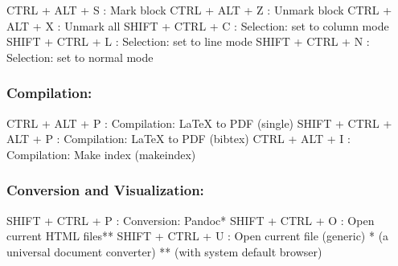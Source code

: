 \vspace{-0.5cm}
\begin{Rtables}[caption={[Selection keyboard shortcuts]
    Selection keyboard shortcuts},
  label=hotkey:selection]
  CTRL  + ALT  + S : Mark block
  CTRL  + ALT  + Z : Unmark block
  CTRL  + ALT  + X : Unmark all
  SHIFT + CTRL + C : Selection: set to column mode
  SHIFT + CTRL + L : Selection: set to line mode
  SHIFT + CTRL + N : Selection: set to normal mode
\end{Rtables}


\subsubsection{Compilation:}

\vspace{-0.5cm}
\begin{Rtables}[caption={[Compilation keyboard shortcuts]
    Compilation keyboard shortcuts},
  label=hotkey:compilation]
  CTRL  + ALT  + P       : Compilation: LaTeX to PDF (single)
  SHIFT + CTRL + ALT + P : Compilation: LaTeX to PDF (bibtex)
  CTRL  + ALT  + I       : Compilation: Make index (makeindex)
\end{Rtables}


\subsubsection{Conversion and Visualization:}

\vspace{-0.5cm}
\begin{Rtables}[caption={[Conversion and visualization keyboard shortcuts]
    Conversion and visualization keyboard shortcuts},
  label=hotkey:conversion]
  SHIFT + CTRL + P : Conversion: Pandoc*
  SHIFT + CTRL + O : Open current HTML files**
  SHIFT + CTRL + U : Open current file (generic)
  *  (a universal document converter)
  ** (with system default browser)
\end{Rtables}



